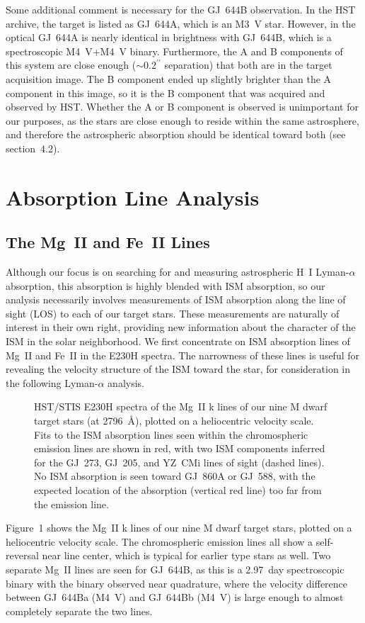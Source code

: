 \documentclass[preprint]{aastex}
\begin{document}
     Some additional comment is necessary for the GJ~644B observation.
In the HST archive, the target is listed as GJ~644A, which is an M3~V star.
However, in the optical GJ~644A is nearly identical in brightness with
GJ~644B, which is a spectroscopic M4~V+M4~V binary.  Furthermore, the A and
B components of this system are close enough ($\sim 0.2^{\prime\prime}$
separation) that both are in the target acquisition image.  The B component
ended up slightly brighter than the A component in this image, so it is the B
component that was acquired and observed by HST.  Whether the A or B
component is observed is unimportant for our purposes, as the stars are close
enough to reside within the same astrosphere, and therefore the astrospheric
absorption should be identical toward both (see section~4.2).

\section{Absorption Line Analysis}

\subsection{The Mg~II and Fe~II Lines}

     Although our focus is on searching for and measuring astrospheric
H~I Lyman-$\alpha$ absorption, this absorption is
highly blended with ISM absorption, so our analysis necessarily involves
measurements of ISM absorption along the line of sight (LOS) to each of our
target stars.  These measurements are naturally of interest in their own
right, providing new information about the character of the ISM in the
solar neighborhood.  We first concentrate on ISM absorption lines of Mg~II
and Fe~II in the E230H spectra.  The narrowness of these lines is useful
for revealing the velocity structure of the ISM toward
the star, for consideration in the following Lyman-$\alpha$ analysis.  

\begin{figure}[t]
\caption{HST/STIS E230H spectra of the Mg~II k lines of
  our nine M dwarf target stars (at 2796~\AA), plotted on a
  heliocentric velocity scale.  Fits to the ISM absorption
  lines seen within the chromospheric emission lines are
  shown in red, with two ISM components inferred for the
  GJ~273, GJ~205, and YZ~CMi lines of sight (dashed lines).
  No ISM absorption is seen toward GJ~860A or GJ~588, with
  the expected location of the absorption (vertical red line)
  too far from the emission line.}
\end{figure}
     Figure~1 shows the Mg~II k lines of our nine M dwarf target stars,
plotted on a heliocentric velocity scale.  The chromospheric emission lines
all show a self-reversal near line center, which is typical for earlier
type stars as well.  Two separate Mg~II lines are seen for GJ~644B, as this
is a 2.97~day spectroscopic binary \citep{ds00,tm01}
with the binary observed near quadrature, where the
velocity difference between GJ~644Ba (M4~V) and GJ~644Bb (M4~V) is large
enough to almost completely separate the two lines.
\end{document}

